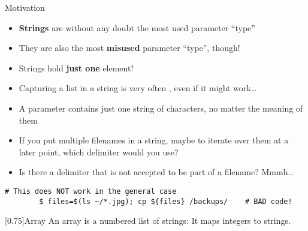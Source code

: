 
\begin{frame}[fragile]{Motivation}
    \vspace{-3mm}
    \begin{itemize}
        \item \textbf{Strings} are without any doubt the most used parameter ``type''
        \item They are also the most \textbf{misused} parameter ``type'', though!
        \item Strings hold \alert{\textbf{just one}} element!
        \item Capturing a list in a string is very often , even if it might work\ldots
        \item A parameter contains just one string of characters, no matter the meaning of them
        \item If you put multiple filenames in a string, maybe to iterate over them at a later point, which delimiter would you use?
        \item Is there a delimiter that is not accepted to be part of a filename? Mmmh\ldots
    \end{itemize}
    \begin{lstlisting}[style=MyBash, numbers=none]
        # This does NOT work in the general case
        $ files=$(ls ~/*.jpg); cp ${files} /backups/    # BAD code!
    \end{lstlisting}
    \begin{varblock}{}[0.75\textwidth]{Array}
        An array is a numbered list of strings: It maps integers to strings.
    \end{varblock}
\end{frame}

